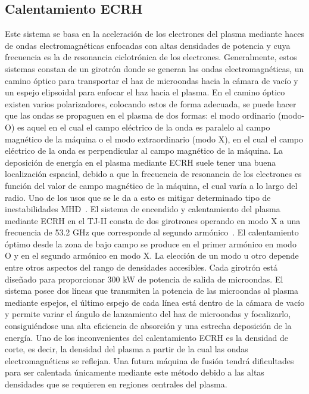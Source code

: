 \subsection*{Calentamiento ECRH}
Este sistema se basa en
la aceleración de los electrones del plasma mediante haces de ondas electromagnéticas enfocadas
con altas densidades de potencia y cuya frecuencia es la de resonancia ciclotrónica de
los electrones.
Generalmente, estos sistemas constan de un girotrón donde se generan las ondas electromagnéticas, 
un camino óptico para transportar el haz de microondas hacia la cámara de
vacío y un espejo elipsoidal para enfocar el haz hacia el plasma.
En el camino óptico existen varios polarizadores, colocando estos de forma adecuada, se puede hacer que las ondas se propaguen
en el plasma de dos formas: el modo ordinario (modo-O) es aquel en el cual el campo
eléctrico de la onda es paralelo al campo magnético de la máquina o el modo extraordinario
(modo X), en el cual el campo eléctrico de la onda es perpendicular al campo magnético de
la máquina. La deposición de energía en el plasma mediante ECRH suele tener una buena localización
espacial, debido a que la frecuencia de resonancia de los electrones es función del valor de
campo magnético de la máquina, el cual varía a lo largo del radio. Uno de los usos que se le
da a esto es mitigar determinado
tipo de inestabilidades MHD~\cite{van_den_Brand_2012}.
El sistema de encendido y calentamiento del plasma mediante ECRH en el TJ-II consta de
dos girotrones operando en modo X a una frecuencia de 53.2 GHz que corresponde al segundo
armónico~\cite{Fernandez2001}. El calentamiento óptimo desde la zona de bajo campo se produce en el
primer armónico en modo O y en el segundo armónico en modo X. La elección de un modo
u otro depende entre otros aspectos del rango de densidades accesibles. Cada girotrón está diseñado
para proporcionar 300 kW de potencia de salida de microondas. El sistema posee dos líneas
que transmiten la potencia de las microondas al plasma mediante espejos, el último espejo
de cada línea está dentro de la cámara de vacío y permite variar el ángulo de lanzamiento
del haz de microondas y focalizarlo, consiguiéndose una alta eficiencia de absorción y una
estrecha deposición de la energía.
Uno de los inconvenientes del calentamiento ECRH es la densidad de corte, es decir, la densidad
del plasma a partir de la cual las ondas electromagnéticas se reflejan. Una futura máquina
de fusión tendrá dificultades para ser calentada únicamente mediante este método debido a
las altas densidades que se requieren en regiones centrales del plasma.

